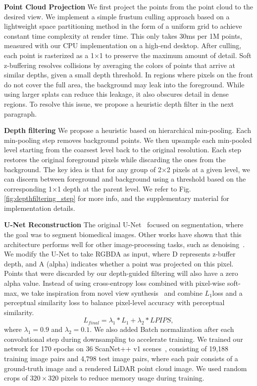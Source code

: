 \documentclass[twocolumn]{article}
\begin{document}
\textbf{Point Cloud Projection} We first project the points from the point cloud to the desired view. We implement a simple frustum culling approach based on a lightweight space partitioning method in the form of a uniform grid to achieve constant time complexity at render time. This only takes 30ms per 1M points, measured with our CPU implementation on a high-end desktop. After culling, each point is rasterized as a 1$\times$1 to preserve the maximum amount of detail. Soft z-buffering resolves collisions by averaging the colors of points that arrive at similar depths, given a small depth threshold. In regions where pixels on the front do not cover the full area, the background may leak into the foreground. While using larger splats can reduce this leakage, it also obscures detail in dense regions. To resolve this issue, we propose a heuristic depth filter in the next paragraph.%


\textbf{Depth filtering} We propose a heuristic based on hierarchical min-pooling. Each min-pooling step removes background points. We then upsample each min-pooled level starting from the coarsest level back to the original resolution. Each step restores the original foreground pixels while discarding the ones from the background. The key idea is that for any group of 2$\times$2 pixels at a given level, we can discern between foreground and background using a threshold based on the corresponding 1$\times$1 depth at the parent level. We refer to Fig. \ref{fig:depthfiltering_step} for more info, and the supplementary material for implementation details.
 
\textbf{U-Net Reconstruction}
The original U-Net~\cite{unet} focused on segmentation, where the goal was to segment biomedical images. Other works have shown that this architecture performs well for other image-processing tasks, such as denoising~\cite{gurrola2021residual}. We modify the U-Net to take RGBDA as input, where D represents z-buffer depth, and A (alpha) indicates whether a point was projected on this pixel. Points that were discarded by our depth-guided filtering will also have a zero alpha value. Instead of using cross-entropy loss combined with pixel-wise soft-max, we take inspiration from novel view synthesis~\cite{kerbl3Dgaussians} and combine $L_1$loss and a perceptual similarity loss to balance pixel-level accuracy with perceptual similarity. 
\[L_{final} = \lambda_{1}*L_1 + \lambda_{2}*LPIPS,\]
where $\lambda_1 = 0.9$ and $\lambda_2 = 0.1$. We also added Batch normalization after each convolutional step during downsampling to accelerate training. We trained our network for 170 epochs on 36 ScanNet++ v1 scenes~\cite{yeshwanthliu2023scannetpp}, consisting of 19,188 training image pairs and 4,798 test image pairs, where each pair consists of a ground-truth image and a rendered LiDAR point cloud image. We used random crops of $320 \times 320$ pixels to reduce memory usage during training.
\end{document}
